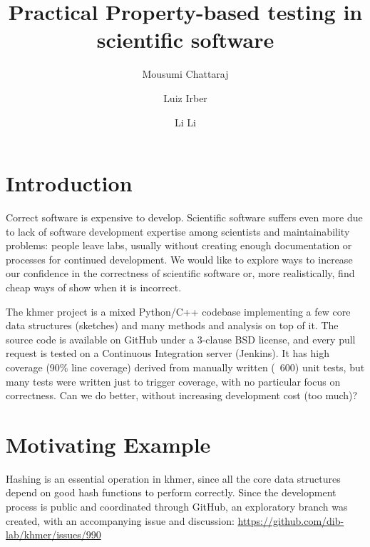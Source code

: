 \documentclass[preprint,nocopyrightspace]{sig-alternate}
\begin{document}
%

\title{Practical Property-based testing in scientific software}

\author{Mousumi Chattaraj}
\author{Luiz Irber}
\author{Li Li}


\maketitle


\section{Introduction}
Correct software is expensive to develop.
Scientific software suffers even more due to lack of software development expertise among scientists and maintainability problems:
people leave labs,
usually without creating enough documentation or processes for continued development.
We would like to explore ways to increase our confidence in the correctness of scientific software or,
more realistically,
find cheap ways of show when it is incorrect.

The khmer project is a mixed Python/C++ codebase implementing a few core data structures (sketches) and many methods and analysis on top of it.
The source code is available on GitHub under a 3-clause BSD license,
and every pull request is tested on a Continuous Integration server (Jenkins).
It has high coverage (90\% line coverage) derived from manually written (~600) unit tests,
but many tests were written just to trigger coverage,
with no particular focus on correctness.
Can we do better, without increasing development cost (too much)?

\section{Motivating Example}

Hashing is an essential operation in khmer,
since all the core data structures depend on good hash functions to perform correctly.
Since the development process is public and coordinated through GitHub,
an exploratory branch was created,
with an accompanying issue and discussion:
\url{https://github.com/dib-lab/khmer/issues/990}
\end{document}
